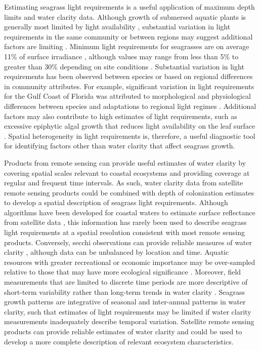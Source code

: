 \documentclass[letterpaper,12pt,oneside]{article}\usepackage[]{graphicx}\usepackage[]{color}
\begin{document}
Estimating seagrass light requirements is a useful application of maximum depth limits and water clarity data.  Although growth of submersed aquatic plants is generally most limited by light availability \citep{Barko82,Hall90,Dennison93}, substantial variation in light requirements in the same community or between regions may suggest additional factors are limiting \citep{Dennison93,Choice14}.  Minimum light requirements for seagrasses are on average 11\% of surface irradiance \citep{Duarte91}, although values may range from less than 5\% to greater than 30\% depending on site conditions \citep{Dennison93}. Substantial variation in light requirements has been observed between species or based on regional differences in community attributes.  For example, significant variation in light requirements for the Gulf Coast of Florida was attributed to morphological and physiological differences between species and adaptations to regional light regimes \citep{Choice14}. Additional factors may also contribute to high estimates of light requirements, such as excessive epiphytic algal growth that reduces light availability on the leaf surface \citep{Kemp04}. Spatial heterogeneity in light requirements is, therefore, a useful diagnostic tool for identifying factors other than water clarity that affect seagrass growth. 

Products from remote sensing can provide useful estimates of water clarity by covering spatial scales relevant to coastal ecosystems and providing coverage at regular and frequent time intervals.  As such, water clarity data from satellite remote sensing products could be combined with depth of colonization estimates to develop a spatial description of seagrass light requirements.  Although algorithms have been developed for coastal waters to estimate surface reflectance from satellite data \citep{Woodruff99,Chen07}, this information has rarely been used to describe seagrass light requirements at a spatial resolution consistent with most remote sensing products.  Conversely, secchi observations can provide reliable measures of water clarity , although data can be unbalanced by location and time.  Aquatic resources with greater recreational or economic importance may be over-sampled relative to those that may have more ecological significance \citep{Wagner08,Lottig14}.  Moreover, field measurements that are limited to discrete time periods are more descriptive of short-term variability rather than long-term trends in water clarity \citep{Elsdon09}.  Seagrass growth patterns are integrative of seasonal and inter-annual patterns in water clarity, such that estimates of light requirements may be limited if water clarity measurements inadequately describe temporal variation.  Satellite remote sensing products can provide reliable estimates of water clarity and could be used to develop a more complete description of relevant ecosystem characteristics.  
\end{document}
